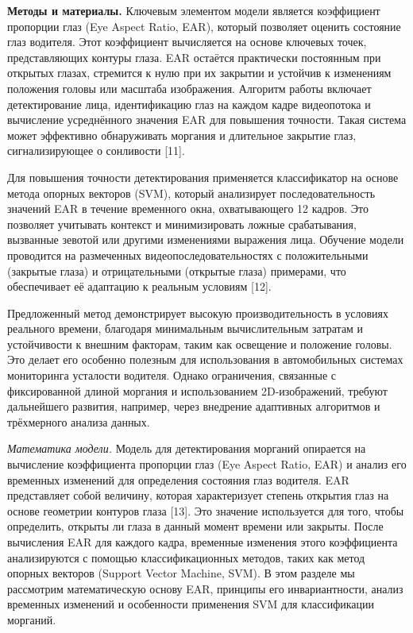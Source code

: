 {\bfseries Методы и материалы.} Ключевым элементом модели является
коэффициент пропорции глаз (Eye Aspect Ratio, EAR), который позволяет
оценить состояние глаз водителя. Этот коэффициент вычисляется на основе
ключевых точек, представляющих контуры глаза. EAR остаётся практически
постоянным при открытых глазах, стремится к нулю при их закрытии и
устойчив к изменениям положения головы или масштаба изображения.
Алгоритм работы включает детектирование лица, идентификацию глаз на
каждом кадре видеопотока и вычисление усреднённого значения EAR для
повышения точности. Такая система может эффективно обнаруживать моргания
и длительное закрытие глаз, сигнализирующее о сонливости {[}11{]}.

Для повышения точности детектирования применяется классификатор на
основе метода опорных векторов (SVM), который анализирует
последовательность значений EAR в течение временного окна, охватывающего
12 кадров. Это позволяет учитывать контекст и минимизировать ложные
срабатывания, вызванные зевотой или другими изменениями выражения лица.
Обучение модели проводится на размеченных видеопоследовательностях с
положительными (закрытые глаза) и отрицательными (открытые глаза)
примерами, что обеспечивает её адаптацию к реальным условиям {[}12{]}.

Предложенный метод демонстрирует высокую производительность в условиях
реального времени, благодаря минимальным вычислительным затратам и
устойчивости к внешним факторам, таким как освещение и положение головы.
Это делает его особенно полезным для использования в автомобильных
системах мониторинга усталости водителя. Однако ограничения, связанные с
фиксированной длиной моргания и использованием 2D-изображений, требуют
дальнейшего развития, например, через внедрение адаптивных алгоритмов и
трёхмерного анализа данных.

\emph{Математика модели.} Модель для детектирования морганий опирается
на вычисление коэффициента пропорции глаз (Eye Aspect Ratio, EAR) и
анализ его временных изменений для определения состояния глаз водителя.
EAR представляет собой величину, которая характеризует степень открытия
глаз на основе геометрии контуров глаза {[}13{]}. Это значение
используется для того, чтобы определить, открыты ли глаза в данный
момент времени или закрыты. После вычисления EAR для каждого кадра,
временные изменения этого коэффициента анализируются с помощью
классификационных методов, таких как метод опорных векторов (Support
Vector Machine, SVM). В этом разделе мы рассмотрим математическую основу
EAR, принципы его инвариантности, анализ временных изменений и
особенности применения SVM для классификации морганий.

